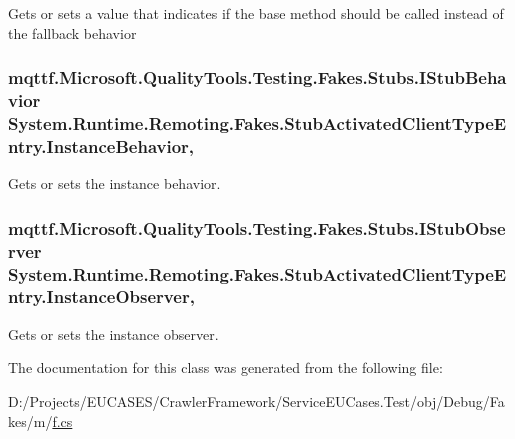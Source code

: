 Gets or sets a value that indicates if the base method should be called instead of the fallback behavior

\hypertarget{class_system_1_1_runtime_1_1_remoting_1_1_fakes_1_1_stub_activated_client_type_entry_a56345e4386d89977ba4fb221708dc903}{
\subsubsection[{Instance\-Behavior}]{\setlength{\rightskip}{0pt plus 5cm}mqttf.\-Microsoft.\-Quality\-Tools.\-Testing.\-Fakes.\-Stubs.\-I\-Stub\-Behavior System.\-Runtime.\-Remoting.\-Fakes.\-Stub\-Activated\-Client\-Type\-Entry.\-Instance\-Behavior\hspace{0.3cm}{\ttfamily [get]}, {\ttfamily [set]}}}\label{class_system_1_1_runtime_1_1_remoting_1_1_fakes_1_1_stub_activated_client_type_entry_a56345e4386d89977ba4fb221708dc903}


Gets or sets the instance behavior.

\hypertarget{class_system_1_1_runtime_1_1_remoting_1_1_fakes_1_1_stub_activated_client_type_entry_a4bcb0b546c52276fc0c155accbfa4d84}{
\subsubsection[{Instance\-Observer}]{\setlength{\rightskip}{0pt plus 5cm}mqttf.\-Microsoft.\-Quality\-Tools.\-Testing.\-Fakes.\-Stubs.\-I\-Stub\-Observer System.\-Runtime.\-Remoting.\-Fakes.\-Stub\-Activated\-Client\-Type\-Entry.\-Instance\-Observer\hspace{0.3cm}{\ttfamily [get]}, {\ttfamily [set]}}}\label{class_system_1_1_runtime_1_1_remoting_1_1_fakes_1_1_stub_activated_client_type_entry_a4bcb0b546c52276fc0c155accbfa4d84}


Gets or sets the instance observer.



The documentation for this class was generated from the following file\-:\begin{DoxyCompactItemize}
\item 
D\-:/\-Projects/\-E\-U\-C\-A\-S\-E\-S/\-Crawler\-Framework/\-Service\-E\-U\-Cases.\-Test/obj/\-Debug/\-Fakes/m/\hyperlink{m_2f_8cs}{f.\-cs}\end{DoxyCompactItemize}
